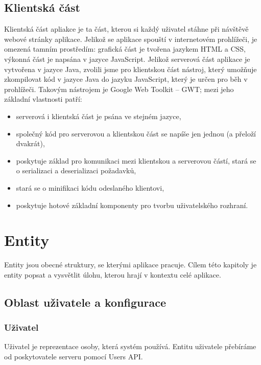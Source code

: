 \subsection{Klientská část}

Klientská část apliakce je ta část, kterou si každý uživatel stáhne při návštěvě webové stránky aplikace.
Jelikož se aplikace spouští v internetovém prohlížeči, je omezená tamním prostředím: grafická část je tvořena jazykem HTML a CSS, výkonná část je napsána v jazyce JavaScript.
Jelikož serverová část aplikace je vytvořena v jazyce Java, zvolili jsme pro klientskou část nástroj, který umožňuje zkompilovat kód v jazyce Java do jazyku JavaScript, který je určen pro běh v prohlížeči.
Takovým nástrojem je Google Web Toolkit -- GWT; mezi jeho základní vlastnosti patří:
\begin{itemize}
	\item serverová i klientská část je psána ve stejném jazyce,
	\item společný kód pro serverovou a klientskou část se napíše jen jednou (a přeloží dvakrát),
	\item poskytuje základ pro komunikaci mezi klientskou a serverovou částí, stará se o serializaci a deserializaci požadavků,
	\item stará se o minifikaci kódu odeslaného klientovi,
	\item poskytuje hotové základní komponenty pro tvorbu uživatelského rozhraní.
\end{itemize}

\section{Entity}

Entity jsou obecné struktury, se kterými aplikace pracuje.
Cílem této kapitoly je entity popsat a vysvětlit úlohu, kterou hrají v kontextu celé aplikace.

\subsection{Oblast uživatele a konfigurace}

\subsubsection{Uživatel}

Uživatel je reprezentace osoby, která systém používá.
Entitu uživatele přebíráme od poskytovatele serveru pomocí Users API.

